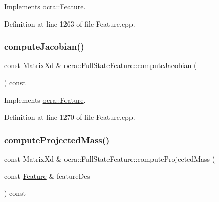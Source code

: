Implements \hyperlink{classocra_1_1Feature_a4fb8eeeed978a1f727ec43cd1bd18d78}{ocra\+::\+Feature}.



Definition at line 1263 of file Feature.\+cpp.

\hypertarget{classocra_1_1FullStateFeature_a9f1b50d69d0a5220286e9a7c3fb54835}{}\label{classocra_1_1FullStateFeature_a9f1b50d69d0a5220286e9a7c3fb54835} 
\subsubsection{\texorpdfstring{compute\+Jacobian()}{computeJacobian()}\hspace{0.1cm}{\footnotesize\ttfamily [2/2]}}
{\footnotesize\ttfamily const Matrix\+Xd \& ocra\+::\+Full\+State\+Feature\+::compute\+Jacobian (\begin{DoxyParamCaption}{ }\end{DoxyParamCaption}) const\hspace{0.3cm}{\ttfamily [virtual]}}



Implements \hyperlink{classocra_1_1Feature_adbab3b388657555abb805bb971c2491f}{ocra\+::\+Feature}.



Definition at line 1270 of file Feature.\+cpp.

\hypertarget{classocra_1_1FullStateFeature_a40f68dad4e231a19b6566fa6829b8f90}{}\label{classocra_1_1FullStateFeature_a40f68dad4e231a19b6566fa6829b8f90} 
\subsubsection{\texorpdfstring{compute\+Projected\+Mass()}{computeProjectedMass()}\hspace{0.1cm}{\footnotesize\ttfamily [1/2]}}
{\footnotesize\ttfamily const Matrix\+Xd \& ocra\+::\+Full\+State\+Feature\+::compute\+Projected\+Mass (\begin{DoxyParamCaption}\item[{const \hyperlink{classocra_1_1Feature}{Feature} \&}]{feature\+Des }\end{DoxyParamCaption}) const\hspace{0.3cm}{\ttfamily [virtual]}}



